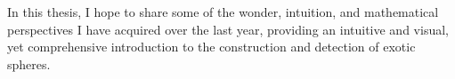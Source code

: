 In this thesis, I hope to share some of the wonder, intuition, and mathematical perspectives I have acquired over the last year, providing an intuitive and visual, yet comprehensive introduction to the construction and detection of exotic spheres.


%





%
